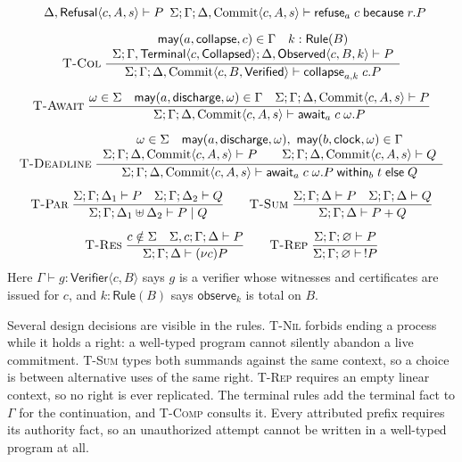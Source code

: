 \documentclass[11pt,openany]{book}
\theoremstyle{remark}
\newcommand{\Commit}{\operatorname{Commit}}
\begin{document}
{\[\begin{gathered}
{\begin{array}{c}
\Delta,\mathsf{Refusal}\langle c,A,s\rangle\vdash P\end{array}}
{\Sigma;\Gamma;\Delta,\Commit\langle c,A,s\rangle\vdash
\mathsf{refuse}_a\;c\;\mathsf{because}\;r.P}
\\[1.2ex]
\textsc{T-Col}\;
\frac{\begin{array}{c}\mathsf{may}(a,\mathsf{collapse},c)\in\Gamma\quad
k:\mathsf{Rule}(B)\\
\Sigma;\Gamma,\mathsf{Terminal}\langle c,\mathsf{Collapsed}\rangle;
\Delta,\mathsf{Observed}\langle c,B,k\rangle\vdash P\end{array}}
{\Sigma;\Gamma;\Delta,\Commit\langle c,B,\mathsf{Verified}\rangle\vdash
\mathsf{collapse}_{a,k}\;c.P}
\\[1.2ex]
\textsc{T-Await}\;
\frac{\omega\in\Sigma\quad\mathsf{may}(a,\mathsf{discharge},\omega)\in\Gamma\quad
\Sigma;\Gamma;\Delta,\Commit\langle c,A,s\rangle\vdash P}
{\Sigma;\Gamma;\Delta,\Commit\langle c,A,s\rangle\vdash\mathsf{await}_a\;c\;\omega.P}
\\[1.2ex]
\textsc{T-Deadline}\;
\frac{\begin{array}{c}\omega\in\Sigma\quad
\mathsf{may}(a,\mathsf{discharge},\omega),\ \mathsf{may}(b,\mathsf{clock},\omega)\in\Gamma\\
\Sigma;\Gamma;\Delta,\Commit\langle c,A,s\rangle\vdash P\qquad
\Sigma;\Gamma;\Delta,\Commit\langle c,A,s\rangle\vdash Q\end{array}}
{\Sigma;\Gamma;\Delta,\Commit\langle c,A,s\rangle\vdash
\mathsf{await}_a\;c\;\omega.P\;\mathsf{within}_b\;t\;\mathsf{else}\;Q}
\\[1.2ex]
\textsc{T-Par}\;
\frac{\Sigma;\Gamma;\Delta_1\vdash P\quad\Sigma;\Gamma;\Delta_2\vdash Q}
{\Sigma;\Gamma;\Delta_1\uplus\Delta_2\vdash P\mid Q}
\qquad
\textsc{T-Sum}\;
\frac{\Sigma;\Gamma;\Delta\vdash P\quad\Sigma;\Gamma;\Delta\vdash Q}
{\Sigma;\Gamma;\Delta\vdash P+Q}
\\[1.2ex]
\textsc{T-Res}\;
\frac{c\notin\Sigma\quad\Sigma,c;\Gamma;\Delta\vdash P}
{\Sigma;\Gamma;\Delta\vdash(\nu c)P}
\qquad
\textsc{T-Rep}\;
\frac{\Sigma;\Gamma;\varnothing\vdash P}{\Sigma;\Gamma;\varnothing\vdash\,!P}
\end{gathered}
\]
}
Here $\Gamma\vdash g:\mathsf{Verifier}\langle c,B\rangle$ says $g$ is a
verifier whose witnesses and certificates are issued for $c$, and
$k:\mathsf{Rule}(B)$ says $\mathsf{observe}_k$ is total on $B$.

Several design decisions are visible in the rules. \textsc{T-Nil} forbids
ending a process while it holds a right: a well-typed program cannot
silently abandon a live commitment. \textsc{T-Sum} types both summands
against the same context, so a choice is between alternative uses of the
same right. \textsc{T-Rep} requires an empty linear context, so no right
is ever replicated. The terminal rules add the terminal fact to $\Gamma$
for the continuation, and \textsc{T-Comp} consults it. Every attributed
prefix requires its authority fact, so an unauthorized attempt cannot be
written in a well-typed program at all.
\end{document}
